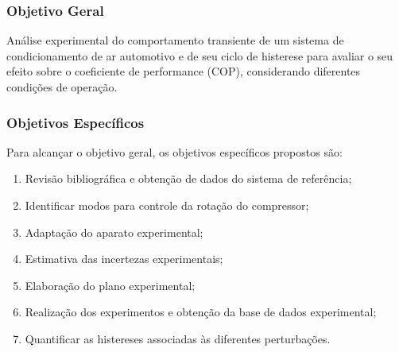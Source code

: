 \subsubsection{Objetivo Geral}

Análise experimental do comportamento transiente de um sistema de condicionamento de ar automotivo e de seu ciclo de histerese para avaliar o seu efeito sobre o coeficiente de performance (COP), considerando diferentes condições de operação.

\subsubsection{Objetivos Específicos}

Para alcançar o objetivo geral, os objetivos específicos propostos são:

\begin{enumerate}[label=\arabic*]
    \item Revisão bibliográfica e obtenção de dados do sistema de referência;
    
    \item Identificar modos para controle da rotação do compressor;
    
    \item Adaptação do aparato experimental;
    
    \item Estimativa das incertezas experimentais;

    \item Elaboração do plano experimental;
    
    \item Realização dos experimentos e obtenção da base de dados experimental;
    
    \item Quantificar as histereses associadas às diferentes perturbações.

\end{enumerate}
